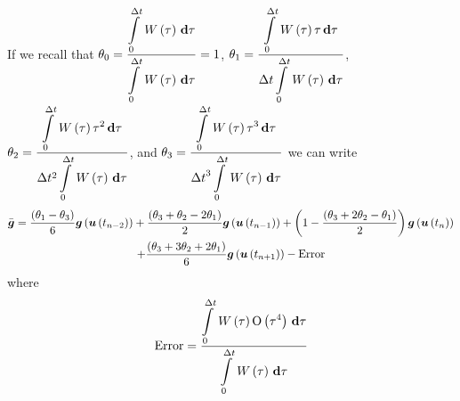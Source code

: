 If we recall that $\theta_{0}=\dfrac{\gint{0}{\Delta
    t}{\fnof{W}{\tau}}{\tau}}{\gint{0}{\Delta t}{\fnof{W}{\tau}}{\tau}}=1$,
$\theta_{1}=\dfrac{\gint{0}{\Delta t}{\fnof{W}{\tau}\tau}{\tau}}{\Delta
  t\gint{0}{\Delta t}{\fnof{W}{\tau}}{\tau}}$,
$\theta_{2}=\dfrac{\gint{0}{\Delta t}{\fnof{W}{\tau}\tau^{2}}{\tau}}{\Delta
  t^{2}\gint{0}{\Delta t}{\fnof{W}{\tau}}{\tau}}$, and
$\theta_{3}=\dfrac{\gint{0}{\Delta t}{\fnof{W}{\tau}\tau^{3}}{\tau}}{{\Delta
    t}^{3}\gint{0}{\Delta t}{\fnof{W}{\tau}}{\tau}}$ we can write
\begin{multline}
  \bar{\vect{g}}=\dfrac{\pbrac{\theta_{1}-\theta_{3}}}{6}\fnof{\vectr{g}}{\fnof{\vectr{u}}{t_{n-2}}}
  +\dfrac{\pbrac{\theta_{3}+\theta_{2}-2\theta_{1}}}{2}\fnof{\vectr{g}}{\fnof{\vectr{u}}{t_{n-1}}}
  +\pbrac{1-\dfrac{\pbrac{\theta_{3}+2\theta_{2}-\theta_{1}}}{2}}\fnof{\vectr{g}}{\fnof{\vectr{u}}{t_{n}}} \\
  +\dfrac{\pbrac{\theta_{3}+3\theta_{2}+2\theta_{1}}}{6}\fnof{\vectr{g}}{\fnof{\vectr{u}}{t_{n+1}}}
  -\text{Error}
\end{multline}
where
\begin{equation}
  \text{Error}=\dfrac{\gint{0}{\Delta t}{\fnof{W}{\tau}\orderof{\tau^{4}}}{\tau}}{
    \gint{0}{\Delta t}{\fnof{W}{\tau}}{\tau}}
\end{equation}

